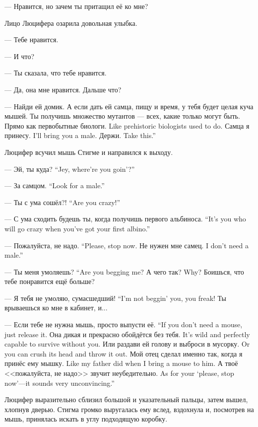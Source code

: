 --- Нравится, но зачем ты притащил её ко мне?

Лицо Люцифера озарила довольная улыбка.

--- Тебе нравится.

--- И что?

--- Ты сказала, что тебе нравится.

--- Да, она мне нравится.
Дальше что?

--- Найди ей домик.
А если дать ей самца, пищу и время, у тебя будет целая куча мышей.
Ты получишь множество мутантов --- всех, какие только могут быть.
{Прямо как первобытные биологи.}
{Like prehistoric biologists used to do.}
{Самца я принесу.}
{I'll bring you a male.}
{Держи.}
{Take this.''}

Люцифер всучил мышь Стигме и направился к выходу.

{--- Эй, ты куда?}
{``Jey, where're you goin'?''}

{--- За самцом.}
{``Look for a male.''}

{--- Ты с ума сошёл?!}
{``Are you crazy!''}

{--- С ума сходить будешь ты, когда получишь первого альбиноса.}
{``It's you who will go crazy when you've got your first albino.''}

{--- Пожалуйста, не надо.}
{``Please, stop now.}
{Не нужен мне самец.}
{I don't need a male.''}

{--- Ты меня умоляешь?}
{``Are you begging me?}
{А чего так?}
{Why?}
Боишься, что тебе понравится ещё больше?

{--- Я тебя не умоляю, сумасшедший!}
{``I'm not beggin' you, you freak!}
Ты врываешься ко мне в кабинет, и...

{--- Если тебе не нужна мышь, просто выпусти её.}
{``If you don't need a mouse, just release it.}
{Она дикая и прекрасно обойдётся без тебя.}
{It's wild and perfectly capable to survive without you.}
{Или раздави ей голову и выброси в мусорку.}
{Or you can crush its head and throw it out.}
{Мой отец сделал именно так, когда я принёс ему мышку.}
{Like my father did when I bring a mouse to him.}
{А твоё <<пожалуйста, не надо>> звучит неубедительно.}
{As for your `please, stop now'---it sounds very unconvincing.''}

Люцифер выразительно сблизил большой и указательный пальцы, затем вышел, хлопнув дверью.
Стигма громко выругалась ему вслед, вздохнула и, посмотрев на мышь, принялась искать в углу подходящую коробку.

